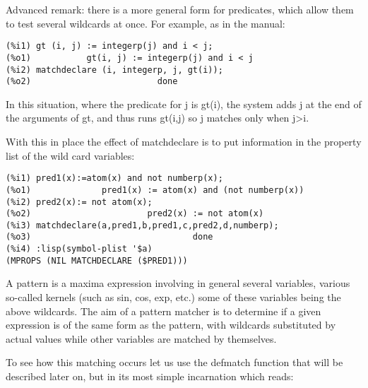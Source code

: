 \documentclass[a4paper,11pt]{article}
\begin{document}
Advanced remark: there is a more general form for predicates, which allow them
to test several wildcards at once. For example, as in the manual:
\begin{verbatim}
(%i1) gt (i, j) := integerp(j) and i < j;
(%o1)           gt(i, j) := integerp(j) and i < j
(%i2) matchdeclare (i, integerp, j, gt(i));
(%o2)                         done
\end{verbatim}

In this situation, where the predicate for j is gt(i), the system adds j at the
end of the arguments of gt, and thus runs gt(i,j) so j matches only when
j>i. 


With this in place the effect of matchdeclare is to put information
in the property list of the wild card variables:
\begin{verbatim}
(%i1) pred1(x):=atom(x) and not numberp(x);
(%o1)              pred1(x) := atom(x) and (not numberp(x))
(%i2) pred2(x):= not atom(x);
(%o2)                       pred2(x) := not atom(x)
(%i3) matchdeclare(a,pred1,b,pred1,c,pred2,d,numberp);
(%o3)                                done
(%i4) :lisp(symbol-plist '$a) 
(MPROPS (NIL MATCHDECLARE ($PRED1)))
\end{verbatim}

A pattern is a maxima expression involving in general several
variables, various so-called kernels (such as sin, cos, exp, etc.)
some of these variables being the above wildcards. The aim of a
pattern matcher is to determine if a given expression is of the same
form as the pattern, with wildcards substituted by actual values
while other variables are matched by themselves.


To see how this matching occurs let us use the defmatch function that
will be described later on, but in its most simple incarnation which
reads:
\end{document}
